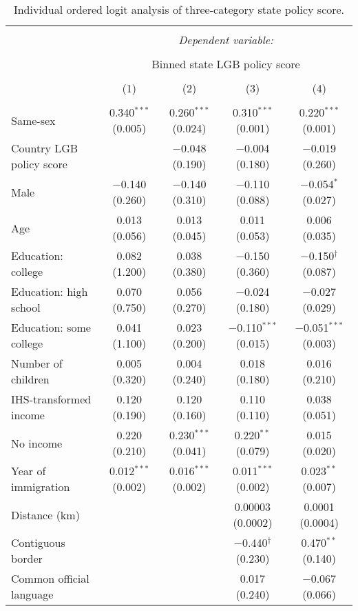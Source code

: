 \documentclass[
  11pt,
]{article}
\begin{document}
\begin{table}[H] \centering 
  \caption{Individual ordered logit analysis of three-category state policy score.} 
  \label{tab:ord-full} 
\footnotesize 
\begin{tabular}{@{\extracolsep{5pt}}lcccc} 
\\[-1.8ex]\hline 
\hline \\[-1.8ex] 
 & \multicolumn{4}{c}{\textit{Dependent variable:}} \\ 
\cline{2-5} 
\\[-1.8ex] & \multicolumn{4}{c}{Binned state LGB policy score} \\ 
\\[-1.8ex] & (1) & (2) & (3) & (4)\\ 
\hline \\[-1.8ex] 
 Same-sex & 0.340$^{***}$ (0.005) & 0.260$^{***}$ (0.024) & 0.310$^{***}$ (0.001) & 0.220$^{***}$ (0.001) \\ 
  Country LGB policy score &  & $-$0.048 (0.190) & $-$0.004 (0.180) & $-$0.019 (0.260) \\ 
  Male & $-$0.140 (0.260) & $-$0.140 (0.310) & $-$0.110 (0.088) & $-$0.054$^{*}$ (0.027) \\ 
  Age & 0.013 (0.056) & 0.013 (0.045) & 0.011 (0.053) & 0.006 (0.035) \\ 
  Education: college & 0.082 (1.200) & 0.038 (0.380) & $-$0.150 (0.360) & $-$0.150$^{†}$ (0.087) \\ 
  Education: high school & 0.070 (0.750) & 0.056 (0.270) & $-$0.024 (0.180) & $-$0.027 (0.029) \\ 
  Education: some college & 0.041 (1.100) & 0.023 (0.200) & $-$0.110$^{***}$ (0.015) & $-$0.051$^{***}$ (0.003) \\ 
  Number of children & 0.005 (0.320) & 0.004 (0.240) & 0.018 (0.180) & 0.016 (0.210) \\ 
  IHS-transformed income & 0.120 (0.190) & 0.120 (0.160) & 0.110 (0.110) & 0.038 (0.051) \\ 
  No income & 0.220 (0.210) & 0.230$^{***}$ (0.041) & 0.220$^{**}$ (0.079) & 0.015 (0.020) \\ 
  Year of immigration & 0.012$^{***}$ (0.002) & 0.016$^{***}$ (0.002) & 0.011$^{***}$ (0.002) & 0.023$^{**}$ (0.007) \\ 
  Distance (km) &  &  & 0.00003 (0.0002) & 0.0001 (0.0004) \\ 
  Contiguous border &  &  & $-$0.440$^{†}$ (0.230) & 0.470$^{**}$ (0.140) \\ 
  Common official language &  &  & 0.017 (0.240) & $-$0.067 (0.066) \\ 

\end{tabular}
\end{table}
\end{document}

